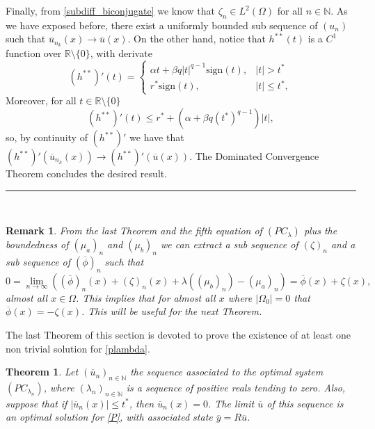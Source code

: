 \documentclass[11pt,a4paper]{amsart}
\newcommand{\kw}{\rule{2mm}{2mm}}
\newcommand{\om}{\Omega}
\newcommand{\sign}{\mathrm{sign}}
\renewenvironment{proof}{{Proof.}}{\hfill\kw}
\newtheorem{remark}{{Remark}}
\newtheorem{theorem}{{Theorem}}
\begin{document}
\begin{proof}
Finally, from \eqref{subdiff_biconjugate} we know that $\zeta_n\in L^2(\Omega)$ for all $n\in \mathbb{N}$. As we have exposed before, there exist a uniformly bounded sub sequence of $(u_n)$ such that $\overline{u}_{n_k}(x)\to \overline{u}(x)$. On the other hand, notice that $h^{**}(t)$ is a $C^1$ function over $\mathbb{R}\setminus\{0\}$, with derivate
\[
(h^{**})'(t)=\begin{cases}
    \alpha t+\beta q |t|^{q-1}\sign(t), &|t|>t^*\\
            r^*\sign(t), &|t|\le t^*,
    \end{cases}
\]
Moreover, for all $t\in\mathbb{R}\setminus\{0\}$
\[
(h^{**})'(t)\le r^{*}+(\alpha+\beta q(t^{*})^{q-1})|t|,
\]
so, by continuity of $(h^{**})'$ we have that $(h^{**})'(\overline{u}_{n_k}(x))\to (h^{**})'(\overline{u}(x))$. The Dominated Convergence Theorem concludes the desired result.
\end{proof}\\

\begin{remark}
From the last Theorem and the fifth equation of $(PC_{\lambda})$ plus the boundedness of $(\mu_{a})_{n}$ and $(\mu_{b})_{n}$ we can extract a sub sequence of $(\zeta)_{n}$ and a sub sequence of $(\overline{\phi})_n$ such that
\[
0=\lim_{n\to \infty}((\overline{\phi})_n(x)+(\zeta)_{n}(x)+\lambda((\mu_{b})_{n})-(\mu_{a})_{n})=\overline{\phi}(x)+\zeta(x),
\]
almost all $x\in \Omega$. This implies that for almost all $x$ where $|\om_0|=0$ that $\overline{\phi}(x)=-\zeta(x)$. This will be useful for the next Theorem.
\end{remark}


The last Theorem of this section is devoted to prove the existence of at least one non trivial solution for \eqref{plambda}. 

\begin{theorem}
    Let $(\overline{u}_{n})_{n\in \mathbb{N}}$ the sequence associated to the optimal system $(PC_{\lambda_n})$, where $(\lambda_n)_{n\in \mathbb{N}}$ is a sequence of positive reals tending to zero. Also, suppose that if $|\overline{u}_{n}(x)|\le t^*$, then $\overline{u}_{n}(x)=0$. The limit $\overline{u}$ of this sequence is an optimal solution for \eqref{P}, with associated state $\overline{y}=R\overline{u}$.
\end{theorem}
\end{document}

